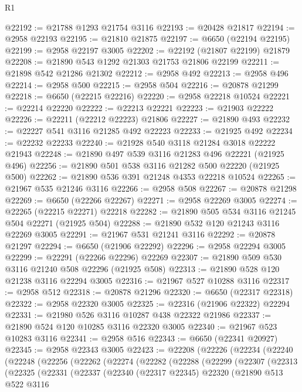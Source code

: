 \begin{lexlean}{R1}
\begin{coremodule}
@22192 := @21788 @1293 @21754 @3116
@22193 := @20428 @21817
@22194 := @2958 @22193
@22195 := @21810 @21875
@22197 := @6650 (@22194 @22195)
@22199 := @2958 @22197 @3005
@22202 := @22192 (@21807 @22199) @21879
@22208 := @21890 @543 @1292 @21303 @21753 @21806 @22199
@22211 := @21898 @542 @21286 @21302
@22212 := @2958 @492
@22213 := @2958 @496
@22214 := @2958 @500
@22215 := @2958 @504
@22216 := @20878 @21299
@22218 := @6650 (@22215 @22216)
@22220 := @2958 @22218 @10524
@22221 := @22214 @22220
@22222 := @22213 @22221
@22223 := @21903 @22222
@22226 := @22211 (@22212 @22223) @21806
@22227 := @21890 @493
@22232 := @22227 @541 @3116 @21285 @492 @22223
@22233 := @21925 @492
@22234 := @22232 @22233
@22240 := @21928 @540 @3118 @21284 @3018 @22222 @21943
@22248 := @21890 @497 @539 @3116 @21283 @496 @22221 (@21925 @496)
@22256 := @21890 @501 @538 @3116 @21282 @500 @22220 (@21925 @500)
@22262 := @21890 @536 @391 @21248 @4353 @22218 @10524
@22265 := @21967 @535 @21246 @3116
@22266 := @2958 @508
@22267 := @20878 @21298
@22269 := @6650 (@22266 @22267)
@22271 := @2958 @22269 @3005
@22274 := @22265 (@22215 @22271) @22218
@22282 := @21890 @505 @534 @3116 @21245 @504 @22271 (@21925 @504)
@22288 := @21890 @532 @120 @21243 @3116 @22269 @3005
@22291 := @21967 @531 @21241 @3116
@22292 := @20878 @21297
@22294 := @6650 (@21906 @22292)
@22296 := @2958 @22294 @3005
@22299 := @22291 (@22266 @22296) @22269
@22307 := @21890 @509 @530 @3116 @21240 @508 @22296 (@21925 @508)
@22313 := @21890 @528 @120 @21238 @3116 @22294 @3005
@22316 := @21967 @527 @10288 @3116
@22317 := @2958 @512
@22318 := @20878 @21296
@22320 := @6650 (@22317 @22318)
@22322 := @2958 @22320 @3005
@22325 := @22316 (@21906 @22322) @22294
@22331 := @21980 @526 @3116 @10287 @438 @22322 @21986
@22337 := @21890 @524 @120 @10285 @3116 @22320 @3005
@22340 := @21967 @523 @10283 @3116
@22341 := @2958 @516
@22343 := @6650 (@22341 @20927)
@22345 := @2958 @22343 @3005
@22423 := @22208
    (@22226
      (@22234
        (@22240
          (@22248
            (@22256
              (@22262
                (@22274
                  (@22282
                    (@22288
                      (@22299
                        (@22307
                          (@22313
                            (@22325
                              (@22331
                                (@22337
                                  (@22340
                                    (@22317 @22345)
                                    @22320
                                    (@21890
                                      @513
                                      @522
                                      @3116

\end{coremodule}
\end{lexlean}
